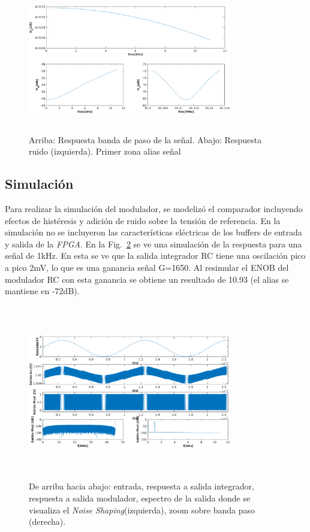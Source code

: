 \documentclass[a4paper,conference]{IEEEtran}
\begin{document}
\begin{figure}[!t]
\centering
\includegraphics[height=2.5in,width=3.5in]{Respuesta_Modulador_Combinada}
\caption{Arriba: Respuesta banda de paso de la se\~nal. Abajo: Respuesta ruido (izquierda). Primer zona alias se\~nal}
\label{fig:Resp_mod}
\end{figure}

\subsection{Simulaci\'on}


Para realizar la simulación del modulador, se modelizó el comparador incluyendo efectos de histéresis y adición de ruido sobre la tensión de referencia. En la simulaci\'on no se incluyeron las caracter\'isticas el\'ectricas de los buffers de entrada y salida de la \textit{FPGA}. En la Fig.~\ref{fig:Sim_mod} se ve una simulaci\'on de la respuesta para una señal de 1kHz. En esta se ve que la salida integrador RC tiene una oscilación pico a pico 2mV, lo que es una ganancia señal G=1650. Al resimular el ENOB del modulador RC con esta ganancia se obtiene un resultado de 10.93 (el alias se mantiene en -72dB).

\begin{figure}[!t]
\centering
\includegraphics[height=3in,width=3.5in]{Simulacion_Modulador}
\caption{De arriba hacia abajo: entrada, respuesta a salida integrador, respuesta a salida modulador,  espectro de la salida donde se visualiza el \textit{Noise Shaping}(izquierda), zoom sobre banda paso (derecha).}
\label{fig:Sim_mod}
\end{figure}
\end{document}

